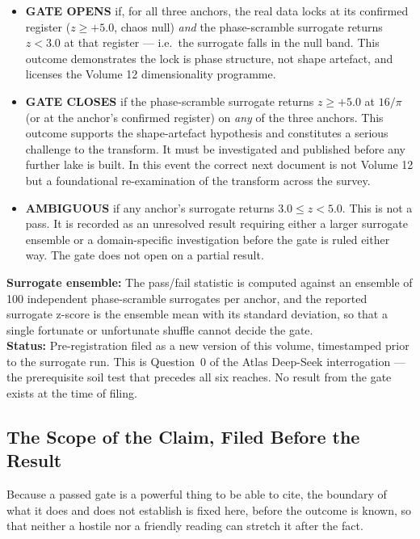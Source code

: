 \documentclass[11pt, letterpaper, openany]{book}
\begin{document}
\begin{predictionbox}
\begin{itemize}
\item \textbf{GATE OPENS} if, for all three anchors, the real data locks at its
confirmed register ($z \geq +5.0$, chaos null) \emph{and} the phase-scramble surrogate
returns $z < 3.0$ at that register --- i.e.\ the surrogate falls in the null band. This
outcome demonstrates the lock is phase structure, not shape artefact, and licenses the
Volume 12 dimensionality programme.
\item \textbf{GATE CLOSES} if the phase-scramble surrogate returns $z \geq +5.0$ at
$16/\pi$ (or at the anchor's confirmed register) on \emph{any} of the three anchors.
This outcome supports the shape-artefact hypothesis and constitutes a serious challenge
to the transform. It must be investigated and published before any further lake is
built. In this event the correct next document is not Volume 12 but a foundational
re-examination of the transform across the survey.
\item \textbf{AMBIGUOUS} if any anchor's surrogate returns $3.0 \leq z < 5.0$. This is
not a pass. It is recorded as an unresolved result requiring either a larger surrogate
ensemble or a domain-specific investigation before the gate is ruled either way. The
gate does not open on a partial result.
\end{itemize}
\textbf{Surrogate ensemble:} The pass/fail statistic is computed against an ensemble of
100 independent phase-scramble surrogates per anchor, and the reported surrogate
z-score is the ensemble mean with its standard deviation, so that a single fortunate or
unfortunate shuffle cannot decide the gate.\\[0.5em]
\textbf{Status:} Pre-registration filed as a new version of this volume, timestamped
prior to the surrogate run. This is Question~0 of the Atlas Deep-Seek interrogation ---
the prerequisite soil test that precedes all six reaches. No result from the gate exists
at the time of filing.
\end{predictionbox}
 
\subsection*{The Scope of the Claim, Filed Before the Result}
 
Because a passed gate is a powerful thing to be able to cite, the boundary of what it
does and does not establish is fixed here, before the outcome is known, so that neither
a hostile nor a friendly reading can stretch it after the fact.
 
\end{document}
